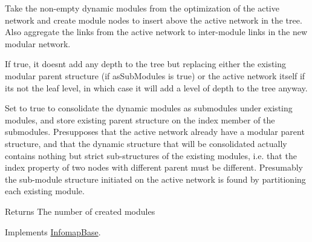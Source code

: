 Take the non-\/empty dynamic modules from the optimization of the active network and create module nodes to insert above the active network in the tree. Also aggregate the links from the active network to inter-\/module links in the new modular network.

If true, it doesn\textquotesingle{}t add any depth to the tree but replacing either the existing modular parent structure (if {\ttfamily as\+Sub\+Modules} is true) or the active network itself if it\textquotesingle{}s not the leaf level, in which case it will add a level of depth to the tree anyway.

Set to true to consolidate the dynamic modules as submodules under existing modules, and store existing parent structure on the index member of the submodules. Presupposes that the active network already have a modular parent structure, and that the dynamic structure that will be consolidated actually contains nothing but strict sub-\/structures of the existing modules, i.\+e. that the index property of two nodes with different parent must be different. Presumably the sub-\/module structure initiated on the active network is found by partitioning each existing module.

\begin{DoxyReturn}{Returns}
The number of created modules 
\end{DoxyReturn}


Implements \mbox{\hyperlink{classInfomapBase_ac6da8d87eb4d0760157367e8fcdfbdbc}{Infomap\+Base}}.


